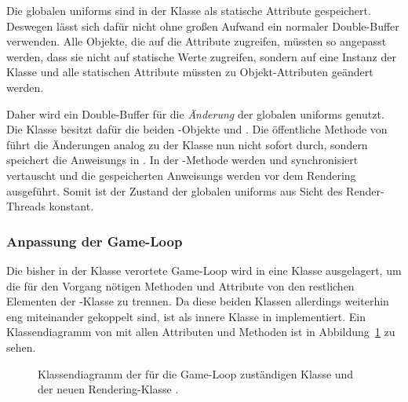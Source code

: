 Die globalen \glspl{uniform} sind in der Klasse \classGlobalUniforms{} als statische Attribute gespeichert. Deswegen lässt sich dafür nicht ohne großen Aufwand ein normaler Double-Buffer verwenden. Alle Objekte, die auf die Attribute zugreifen, müssten so angepasst werden, dass sie nicht auf statische Werte zugreifen, sondern auf eine Instanz der Klasse und alle statischen Attribute müssten zu Objekt-Attributen geändert werden.

Daher wird ein Double-Buffer für die \emph{Änderung} der globalen \glspl{uniform} genutzt. Die Klasse \classMasterRenderer{} besitzt dafür die beiden \classRunnable{}-Objekte  und . Die öffentliche Methode  von \classMasterRenderer{} führt die Änderungen analog zu der Klasse \classLoader{} nun nicht sofort durch, sondern speichert die \glspl{Anweisung} in . In der -Methode werden  und  synchronisiert vertauscht und die gespeicherten \glspl{Anweisung} werden vor dem Rendering ausgeführt. Somit ist der Zustand der globalen \glspl{uniform} aus Sicht des Render-Threads konstant.

\subsubsection{Anpassung der Game-Loop}\label{sec:adjustGameLoop}
Die bisher in der Klasse \classGame{} verortete Game-Loop wird in eine Klasse \classGameLoop{} ausgelagert, um die für den Vorgang nötigen Methoden und Attribute von den restlichen Elementen der \classGame{}-Klasse zu trennen. Da diese beiden Klassen allerdings weiterhin eng miteinander gekoppelt sind, ist \classGameLoop{} als innere Klasse in \classGame{} implementiert. Ein Klassendiagramm von  \classGameLoop{} mit allen Attributen und Methoden ist in Abbildung~\ref{fig:DiagGameLoop} zu sehen.

\begin{figure}[htbp]
	\centering
	
	\caption[Klassendiagramm von \classGameLoop{} und \classRenderThread{}.]{Klassendiagramm der für die Game-Loop zuständigen Klasse \classGameLoop{} und der neuen Rendering-Klasse \classRenderThread{}.}\label{fig:DiagGameLoop}
\end{figure}

